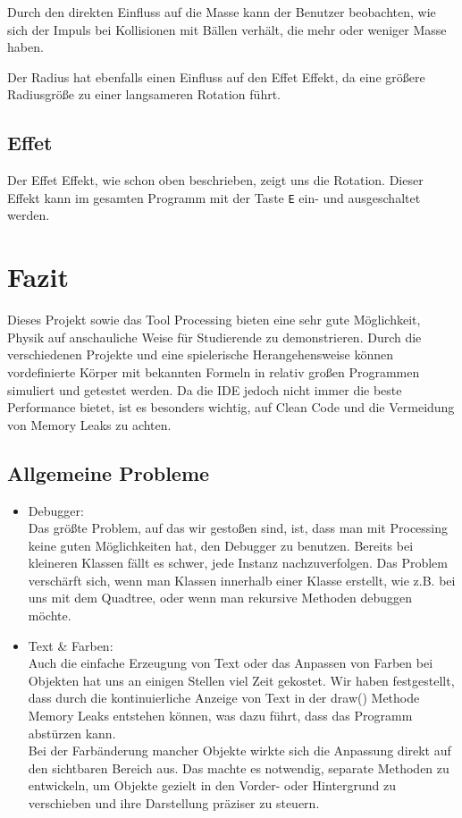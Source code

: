 \documentclass[12pt,a4paper]{article}
\begin{document}
Durch den direkten Einfluss auf die Masse kann der Benutzer beobachten, wie sich der Impuls bei Kollisionen mit Bällen verhält, die mehr oder weniger Masse haben.  

Der Radius hat ebenfalls einen Einfluss auf den Effet Effekt, da eine größere Radiusgröße zu einer langsameren Rotation führt.

	
	
	\subsection{Effet}
	
	Der Effet Effekt, wie schon oben beschrieben, zeigt uns die Rotation. Dieser Effekt kann im gesamten Programm mit der Taste \texttt{E} ein- und ausgeschaltet werden.
	
	\section{Fazit}
	
Dieses Projekt sowie das Tool Processing bieten eine sehr gute Möglichkeit, Physik auf anschauliche Weise für Studierende zu demonstrieren. Durch die verschiedenen Projekte und eine spielerische Herangehensweise können vordefinierte Körper mit bekannten Formeln in relativ großen Programmen simuliert und getestet werden. Da die IDE jedoch nicht immer die beste Performance bietet, ist es besonders wichtig, auf Clean Code und die Vermeidung von Memory Leaks zu achten.

\subsection{Allgemeine Probleme}
\begin{itemize}
	\item Debugger: \\
	Das größte Problem, auf das wir gestoßen sind, ist, dass man mit Processing keine guten Möglichkeiten hat, den Debugger zu benutzen. Bereits bei kleineren Klassen fällt es schwer, jede Instanz nachzuverfolgen. Das Problem verschärft sich, wenn man Klassen innerhalb einer Klasse erstellt, wie z.B. bei uns mit dem Quadtree, oder wenn man rekursive Methoden debuggen möchte.
	\item Text \& Farben:\\
	Auch die einfache Erzeugung von Text oder das Anpassen von Farben bei Objekten hat uns an einigen Stellen viel Zeit gekostet. Wir haben festgestellt, dass durch die kontinuierliche Anzeige von Text in der draw() Methode Memory Leaks entstehen können, was dazu führt, dass das Programm abstürzen kann.\\
	Bei der Farbänderung mancher Objekte wirkte sich die Anpassung direkt auf den sichtbaren Bereich aus. Das machte es notwendig, separate Methoden zu entwickeln, um Objekte gezielt in den Vorder- oder Hintergrund zu verschieben und ihre Darstellung präziser zu steuern.
	
	
	
\end{itemize}
\end{document}
